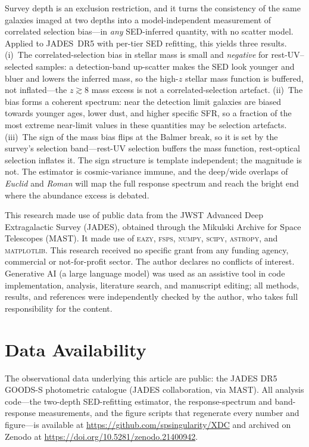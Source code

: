 \documentclass{aa}
\begin{document}
Survey depth is an exclusion restriction, and it turns the consistency of the same galaxies imaged
at two depths into a model-independent measurement of correlated selection bias---in \emph{any}
SED-inferred quantity, with no scatter model. Applied to JADES~DR5 with per-tier SED refitting,
this yields three results. (i)~The correlated-selection bias in stellar mass is small and
\emph{negative} for rest-UV--selected samples: a detection-band up-scatter makes the SED look
younger and bluer and lowers the inferred mass, so the high-$z$ stellar mass function is buffered,
not inflated---the $z\gtrsim8$ mass excess is not a correlated-selection artefact. (ii)~The bias
forms a coherent spectrum: near the detection limit galaxies are biased towards younger ages, lower
dust, and higher specific SFR, so a fraction of the most extreme near-limit values in these
quantities may be selection artefacts. (iii)~The sign of the mass bias flips at the Balmer break,
so it is set by the survey's selection band---rest-UV selection buffers the mass function,
rest-optical selection inflates it. The sign structure is template independent; the magnitude is
not. The estimator is cosmic-variance immune, and the deep/wide overlaps of \emph{Euclid} and
\emph{Roman} will map the full response spectrum and reach the bright end where the abundance
excess is debated.

\begin{acknowledgements}
This research made use of public data from the JWST Advanced Deep Extragalactic Survey (JADES),
obtained through the Mikulski Archive for Space Telescopes (MAST). It made use of \textsc{eazy},
\textsc{fsps}, \textsc{numpy}, \textsc{scipy}, \textsc{astropy}, and \textsc{matplotlib}. This
research received no specific grant from any funding agency, commercial or not-for-profit sector.
The author declares no conflicts of interest. Generative AI (a large language model) was used as an
assistive tool in code implementation, analysis, literature search, and manuscript editing; all
methods, results, and references were independently checked by the author, who takes full
responsibility for the content.
\end{acknowledgements}

\section*{Data Availability}
The observational data underlying this article are public: the JADES DR5 GOODS-S photometric
catalogue (JADES collaboration, via MAST). All analysis code---the two-depth SED-refitting
estimator, the response-spectrum and band-response measurements, and the figure scripts that
regenerate every number and figure---is available at \url{https://github.com/spsingularity/XDC}
and archived on Zenodo at \url{https://doi.org/10.5281/zenodo.21400942}.



\end{document}
